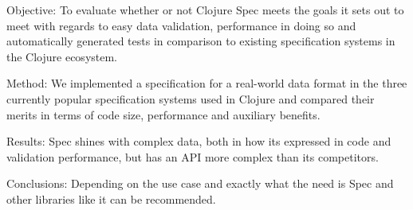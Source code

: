 Objective: To evaluate whether or not Clojure Spec meets the goals it
sets out to meet with regards to easy data validation, performance in
doing so and automatically generated tests in comparison to existing
specification systems in the Clojure ecosystem.

Method: We implemented a specification for a real-world data format in
the three currently popular specification systems used in Clojure and
compared their merits in terms of code size, performance and auxiliary
benefits.

Results: Spec shines with complex data, both in how its expressed in
code and validation performance, but has an API more complex than its
competitors.

Conclusions: Depending on the use case and exactly what the need is Spec
and other libraries like it can be recommended.
